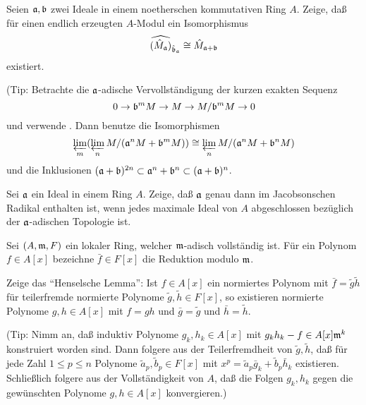 \begin{exercise}
	Seien \(\mathfrak{a}, \mathfrak{b}\) zwei Ideale in einem noetherschen kommutativen Ring \(A\). Zeige, daß für einen endlich erzeugten
	\(A\)-Modul ein Isomorphismus
	\[
		\widehat{(\hat M_{\mathfrak{a}})}_{\hat{\mathfrak{b}}_{\mathfrak{a}}} \cong \hat M_{\mathfrak{a} + \mathfrak{b}}
	\]
	existiert.
	
	(Tip: Betrachte die \(\mathfrak{a}\)-adische Vervollständigung der kurzen exakten Sequenz
	\[
		0 \to \mathfrak{b}^m M \to M \to M/\mathfrak{b}^m M \to 0
	\]
	und verwende . Dann benutze die Isomorphismen
	\[
		\varprojlim\limits_m (\varprojlim\limits_n M/(\mathfrak{a}^n M + \mathfrak{b}^m M)) \cong
		\varprojlim\limits_n M/(\mathfrak{a}^n M + \mathfrak{b}^n M)
	\]
	und die Inklusionen \((\mathfrak{a} + \mathfrak{b})^{2n} \subset \mathfrak{a}^n + \mathfrak{b}^n
	\subset (\mathfrak{a} + \mathfrak{b})^n\).
\end{exercise}

\begin{exercise}
	Sei \(\mathfrak{a}\) ein Ideal in einem Ring \(A\). Zeige, daß \(\mathfrak{a}\) genau dann
	im Jacobsonschen Radikal enthalten ist, wenn jedes maximale Ideal von \(A\) abgeschlossen
	bezüglich der \(\mathfrak{a}\)-adischen Topologie ist.
\end{exercise}

\begin{exercise}
	\label{exer:hensel}
	Sei \((A, \mathfrak{m}, F)\) ein lokaler Ring, welcher \(\mathfrak{m}\)-adisch vollständig ist. Für ein Polynom
	\(f \in A[x]\) bezeichne \(\bar f \in F[x]\) die Reduktion modulo \(\mathfrak{m}\).
	
	Zeige das "`Henselsche Lemma"':
	Ist \(f \in A[x]\) ein normiertes Polynom mit \(\bar f = \tilde g \tilde h\) für teilerfremde normierte Polynome \(\tilde g,
	\tilde h \in F[x]\), so existieren normierte Polynome \(g, h \in A[x]\) mit \(f = g h\) und \(\bar g = \tilde g\) und
	\(\bar h = \tilde h\).
	
	(Tip: Nimm an, daß induktiv Polynome \(g_k, h_k \in A[x]\) mit \(g_k h_k - f \in A[x] \mathfrak{m}^k\) konstruiert worden sind.
	Dann folgere aus der Teilerfremdheit von \(\tilde g, \tilde h\), daß für jede Zahl \(1 \leq p \leq n\) Polynome
	\(\tilde a_p, \tilde b_p \in F[x]\) mit \(x^p = \tilde a_p \bar g_k + \tilde b_p \bar h_k\) existieren.
	Schließlich folgere aus der Vollständigkeit von \(A\), daß die Folgen \(g_k, h_k\) gegen die gewünschten Polynome \(g, h \in A[x]\)
	konvergieren.)
\end{exercise}

